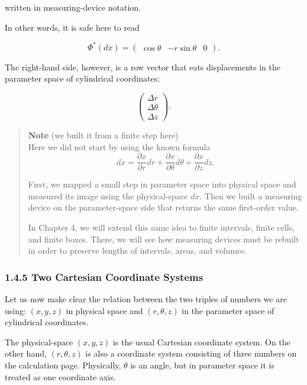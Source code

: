 written in measuring-device notation.

In other words, it is safe here to read

\[
\Phi^*(dx)
=
\begin{pmatrix}
\cos\theta & -r\sin\theta & 0
\end{pmatrix}.
\]

The right-hand side, however, is a row vector that eats displacements in
the parameter space of cylindrical coordinates:

\[
\begin{pmatrix}
\Delta r\\
\Delta\theta\\
\Delta z
\end{pmatrix}.
\]

\begin{quote}
\textbf{Note} (we built it from a finite step here)\\
Here we did not start by using the known formula \[
dx=\frac{\partial x}{\partial r}dr+\frac{\partial x}{\partial\theta}d\theta+\frac{\partial x}{\partial z}dz.
\]

First, we mapped a small step in parameter space into physical space and
measured its image using the physical-space \(dx\). Then we built a
measuring device on the parameter-space side that returns the same
first-order value.

In Chapter 4, we will extend this same idea to finite intervals, finite
cells, and finite boxes. There, we will see how measuring devices must
be rebuilt in order to preserve lengths of intervals, areas, and
volumes.
\end{quote}

\hypertarget{two-cartesian-coordinate-systems}{%
\subsubsection{1.4.5 Two Cartesian Coordinate
Systems}\label{two-cartesian-coordinate-systems}}

Let us now make clear the relation between the two triples of numbers we
are using: \((x,y,z)\) in physical space and \((r,\theta,z)\) in the
parameter space of cylindrical coordinates.

The physical-space \((x,y,z)\) is the usual Cartesian coordinate system.
On the other hand, \((r,\theta,z)\) is also a coordinate system
consisting of three numbers on the calculation page. Physically,
\(\theta\) is an angle, but in parameter space it is treated as one
coordinate axis.


